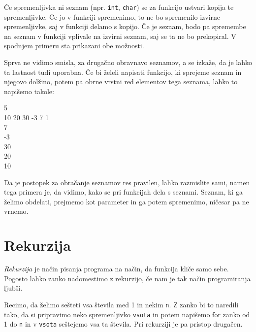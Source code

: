 Če spremenljivka ni seznam (npr. \verb+int+, \verb+char+) se za funkcijo
ustvari kopija te spremenljivke. Če jo v funkciji spremenimo, to ne bo
spremenilo izvirne spremenljivke, saj v funkciji delamo s kopijo. Če je seznam,
bodo pa spremembe na seznam v funkciji vplivale na izvirni seznam, saj se ta ne
bo prekopiral. V spodnjem primeru sta prikazani obe možnosti.

\begin{examples}
\end{examples}

\newpage

Sprva ne vidimo smisla, za drugačno obravnavo seznamov, a se izkaže, da je
lahko ta lastnost tudi uporabna. Če bi želeli napisati funkcijo, ki sprejeme
seznam in njegovo dolžino, potem pa obrne vrstni red elementov tega seznama,
lahko to napišemo takole:

\begin{examples}


    \begin{inout}
        5 \\
        10 20 30 -3 7 1
         \\ 7 \\ -3 \\ 30 \\ 20 \\ 10 \\
    \end{inout}

\end{examples}

Da je postopek za obračanje seznamov res pravilen, lahko razmislite sami, namen
tega primera je, da vidimo, kako se pri funkcijah dela s seznami. Seznam, ki ga
želimo obdelati, prejmemo kot parameter in ga potem spremenimo, ničesar pa ne
vrnemo.


\section{Rekurzija}

\emph{Rekurzija} je način pisanja programa na način, da funkcija kliče samo
sebe. Pogosto lahko zanko nadomestimo z rekurzijo, če nam je tak način
programiranja ljubši.

Recimo, da želimo sešteti vsa števila med 1 in nekim \verb+n+. Z zanko bi to
naredili tako, da si pripravimo neko spremenljivko \verb+vsota+ in potem
napišemo for zanko od 1 do \verb+n+ in v \verb+vsota+ seštejemo vsa ta števila. Pri
rekurziji je pa pristop drugačen.

